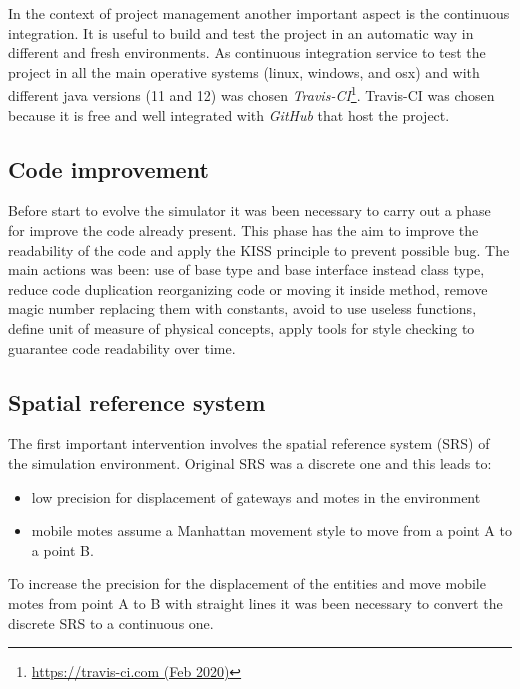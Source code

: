 In the context of project management another important aspect is the continuous integration.
It is useful to build and test the project in an automatic way in different and fresh environments. 
As continuous integration service to test the project in all the main operative systems (linux, windows, and osx) and with different java versions (11 and 12) was chosen \textit{Travis-CI}\footnote{\href{https://travis-ci.com/}{https://travis-ci.com (Feb 2020)}}.
Travis-CI was chosen because it is free and well integrated with \textit{GitHub} that host the project.

\subsection{Code improvement}
Before start to evolve the simulator it was been necessary to carry out a phase for improve the code already present. 
This phase has the aim to improve the readability of the code and apply the KISS principle to prevent possible bug.
The main actions was been: use of base type and base interface instead class type, reduce code duplication reorganizing code or moving it inside method, remove magic number replacing them with constants, avoid to use useless functions, define unit of measure of physical concepts, apply tools for style checking to guarantee code readability over time.

\subsection{Spatial reference system}
The first important intervention involves the spatial reference system (SRS) of the simulation environment. Original SRS was a discrete one and this leads to:
\begin{itemize}
    \item low precision for displacement of gateways and motes in the environment
    \item mobile motes assume a Manhattan movement style to move from a point A to a point B. 
\end{itemize}  
To increase the precision for the displacement of the entities and move mobile motes from point A to B with straight lines it was been necessary to convert the discrete SRS to a continuous one. 

